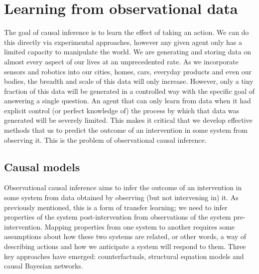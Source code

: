 \documentclass[11pt,a4paper,oneside]{book}
\theoremstyle{plain}
\theoremstyle{definition}
\begin{document}
\chapter{Learning from observational data}
\label{chap:causality}

The goal of causal inference is to learn the effect of taking an action. We can do this directly via experimental approaches, however any given agent only has a limited capacity to manipulate the world. We are generating and storing data on almost every aspect of our lives at an unprecedented rate. As we incorporate sensors and robotics into our cities, homes, cars, everyday products and even our bodies, the breadth and scale of this data will only increase. However, only a tiny fraction of this data will be generated in a controlled way with the specific goal of answering a single question. An agent that can only learn from data when it had explicit control (or perfect knowledge of) the process by which that data was generated will be severely limited. This makes it critical that we develop effective methods that us to predict the outcome of an intervention in some system from observing it. This is the problem of observational causal inference. 

\section{Causal models}
\label{sec:causal_models}

Observational causal inference aims to infer the outcome of an intervention in some system from data obtained by observing (but not intervening in) it. As previously mentioned, this is a form of transfer learning; we need to infer properties of the system post-intervention from observations of the system pre-intervention. Mapping properties from one system to another requires some assumptions about how these two systems are related, or other words, a way of describing actions and how we anticipate a system will respond to them. Three key approaches have emerged: counterfactuals, structural equation models and causal Bayesian networks. 
\end{document}
